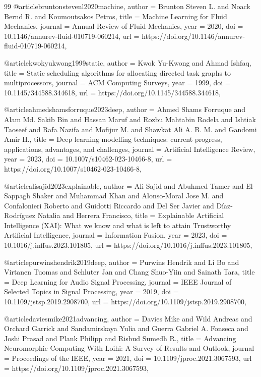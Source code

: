 \documentclass[12pt]{article}
\begin{document}

\begin{thebibliography}{99}
@article{bruntonstevenl2020machine,
  author = {Brunton Steven L. and Noack Bernd R. and Koumoutsakos Petros},
  title = {{Machine Learning for Fluid Mechanics}},
  journal = {Annual Review of Fluid Mechanics},
  year = {2020},
  doi = {10.1146/annurev-fluid-010719-060214},
  url = {https://doi.org/10.1146/annurev-fluid-010719-060214},
}

@article{kwokyukwong1999static,
  author = {Kwok Yu-Kwong and Ahmad Ishfaq},
  title = {{Static scheduling algorithms for allocating directed task graphs to multiprocessors}},
  journal = {ACM Computing Surveys},
  year = {1999},
  doi = {10.1145/344588.344618},
  url = {https://doi.org/10.1145/344588.344618},
}

@article{ahmedshamsforruque2023deep,
  author = {Ahmed Shams Forruque and Alam Md. Sakib Bin and Hassan Maruf and Rozbu Mahtabin Rodela and Ishtiak Taoseef and Rafa Nazifa and Mofijur M. and Shawkat Ali A. B. M. and Gandomi Amir H.},
  title = {{Deep learning modelling techniques: current progress, applications, advantages, and challenges}},
  journal = {Artificial Intelligence Review},
  year = {2023},
  doi = {10.1007/s10462-023-10466-8},
  url = {https://doi.org/10.1007/s10462-023-10466-8},
}

@article{alisajid2023explainable,
  author = {Ali Sajid and Abuhmed Tamer and El-Sappagh Shaker and Muhammad Khan and Alonso-Moral Jose M. and Confalonieri Roberto and Guidotti Riccardo and Del Ser Javier and Díaz-Rodríguez Natalia and Herrera Francisco},
  title = {{Explainable Artificial Intelligence (XAI): What we know and what is left to attain Trustworthy Artificial Intelligence}},
  journal = {Information Fusion},
  year = {2023},
  doi = {10.1016/j.inffus.2023.101805},
  url = {https://doi.org/10.1016/j.inffus.2023.101805},
}

@article{purwinshendrik2019deep,
  author = {Purwins Hendrik and Li Bo and Virtanen Tuomas and Schluter Jan and Chang Shuo-Yiin and Sainath Tara},
  title = {{Deep Learning for Audio Signal Processing}},
  journal = {IEEE Journal of Selected Topics in Signal Processing},
  year = {2019},
  doi = {10.1109/jstsp.2019.2908700},
  url = {https://doi.org/10.1109/jstsp.2019.2908700},
}

@article{daviesmike2021advancing,
  author = {Davies Mike and Wild Andreas and Orchard Garrick and Sandamirskaya Yulia and Guerra Gabriel A. Fonseca and Joshi Prasad and Plank Philipp and Risbud Sumedh R.},
  title = {{Advancing Neuromorphic Computing With Loihi: A Survey of Results and Outlook}},
  journal = {Proceedings of the IEEE},
  year = {2021},
  doi = {10.1109/jproc.2021.3067593},
  url = {https://doi.org/10.1109/jproc.2021.3067593},
}


\end{thebibliography}
\end{document}
